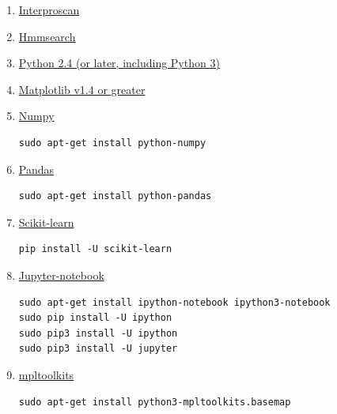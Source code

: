 \documentclass[12pt]{report}
\begin{document}
\begin{enumerate}
\item{\href{https://www.ebi.ac.uk/interpro/interproscan.htm}{Interproscan}}
\item{ \href{http://hmmer.org/}{Hmmsearch}}

\item{\href{https://www.python.org/downloads/}{Python 2.4 (or later, including
Python 3)
    }}

\item{\href{http://matplotlib.org/users/installing.html#most-platforms-
scientific-python-distributions}{Matplotlib v1.4 or greater}}

\item{\href{https://docs.scipy.org
/doc/numpy-1.10.0/user/install.html}{Numpy}}
\begin{verbatim}
sudo apt-get install python-numpy 
\end{verbatim}
\item{\href{http://pandas.pydata.org
/pandas-docs/stable/install.html}{Pandas}}
\begin{verbatim}
sudo apt-get install python-pandas 
\end{verbatim}
\item{\href{http://scikit-learn.org/stable/install.html}{Scikit-learn}}
\begin{verbatim}
pip install -U scikit-learn
\end{verbatim}

\item {\href{http://jupyter.org}{Jupyter-notebook}}
\begin{verbatim}
sudo apt-get install ipython-notebook ipython3-notebook
sudo pip install -U ipython
sudo pip3 install -U ipython
sudo pip3 install -U jupyter
\end{verbatim}
\item {\href{http://matplotlib.org/1.4.3/mpl_toolkits/index.html}{mpltoolkits}}
\begin{verbatim}
sudo apt-get install python3-mpltoolkits.basemap
\end{verbatim}
\end{enumerate}
\end{document}
